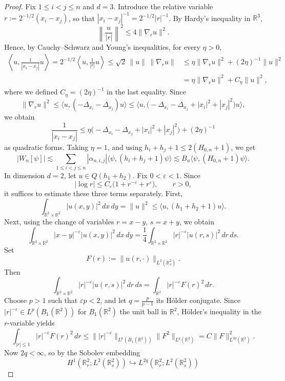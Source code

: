 \documentclass[10pt,a4paper]{amsart}
\newcommand{\R}{\mathbb{R}}
\begin{document}
\begin{proof}
 Fix $1\le i<j\le n$ and $d=3$. Introduce the relative variable $r:=2^{-1/2}{(x_i-x_j)}$, so that ${|x_i-x_j|^{-1}}=2^{-1/2}{|r|^{-1}}$. By Hardy's inequality in $\mathbb R^3$,
\[
\left\|\frac{u}{|r|}\right\|^2\le 4\|\nabla_r u\|^2.
\]
Hence, by Cauchy--Schwarz and Young's inequalities, for every \(\eta>0\),
\begin{align*}
\left\langle u,\frac{1}{|x_i-x_j|}u\right\rangle
=
2^{-1/2}\left\langle u,\frac{1}{|r|}u\right\rangle
\le
\sqrt2\,\|u\|\,\|\nabla_r u\|
&\le
\eta\|\nabla_r u\|^2+ (2\eta)^{-1}\|u\|^2\\
&= \eta\|\nabla_r u\|^2+ C_\eta\|u\|^2,
\end{align*}
where we defined $C_\eta = (2\eta)^{-1}$ in the last equality.
Since
\[
\|\nabla_r u\|^2\le \langle u,(-\Delta_{x_i}-\Delta_{x_j})u\rangle
\le
\langle u,\bigl(-\Delta_{x_i}-\Delta_{x_j}+|x_i|^2+|x_j|^2\bigr)u\rangle,
\]
we obtain
\begin{equation}
\frac{1}{|x_i-x_j|}
\le
\eta\bigl(-\Delta_{x_i}-\Delta_{x_j}+|x_i|^2+|x_j|^2\bigr)+(2\eta)^{-1} \label{usefulestimate111}
\end{equation}
as quadratic forms. Taking \(\eta=1\), and using \(h_i+h_j+1\le 2(H_{0,n}+1)\), we get
\[
|W_n[\psi]|
\lesssim
\sum_{1\le i<j\le n}|\alpha_{n,i,j}|\langle\psi,(h_i+h_j+1)\psi\rangle
\lesssim
B_n\langle\psi,(H_{0,n}+1)\psi\rangle.
\]
In dimension \(d=2\), let \(u\in Q(h_1+h_2)\). Fix \(0<\varepsilon<1\). Since
\[
|\log r|\le C_\varepsilon\bigl(1+r^{-\varepsilon}+r^\varepsilon\bigr),\qquad r>0,
\]
it suffices to estimate these three terms separately. First,
\[
\int_{\R^2\times\R^2}|u(x,y)|^2\,dx\,dy=\|u\|^2
\le
\langle u,(h_1+h_2+1)u\rangle.
\]
Next, using the change of variables \(r=x-y\), \(s=x+y\), we obtain
\[
\int_{\R^2\times\R^2}|x-y|^{-\varepsilon}|u(x,y)|^2\,dx\,dy
=
\frac{1}{4}\int_{\R^2\times\R^2}|r|^{-\varepsilon}|u(r,s)|^2\,dr\,ds.
\]
Set
\[
F(r):=\|u(r,\cdot)\|_{L^2(\R^2_s)}.
\]
Then
\[
\int_{\R^2\times\R^2}|r|^{-\varepsilon}|u(r,s)|^2\,dr\,ds
=\int_{\R^2}|r|^{-\varepsilon}F(r)^2\,dr.
\]
Choose \(p>1\) such that \(\varepsilon p<2\), and let \(q=\frac p{p-1}\) its Hölder conjugate. Since
\(|r|^{-\varepsilon}\in L^p(B_1(\R^2))\) for $B_1(\mathbb{R}^2)$ the unit ball in $\mathbb{R}^2$, Hölder's inequality in the \(r\)-variable yields
\[
\int_{|r|\le1}|r|^{-\varepsilon}F(r)^2\,dr
\le
\bigl\||r|^{-\varepsilon}\bigr\|_{L^p(B_1(\mathbb{R}^2))}\|F^2\|_{L^q(\R^2)}
=
C\|F\|_{L^{2q}(\R^2)}^2.
\]
Now \(2q<\infty\), so by the Sobolev embedding
\[
H^1(\R^2_r;L^2(\R^2_s))\hookrightarrow L^{2q}(\R^2_r;L^2(\R^2_s))
\]
\end{proof}
\end{document}
